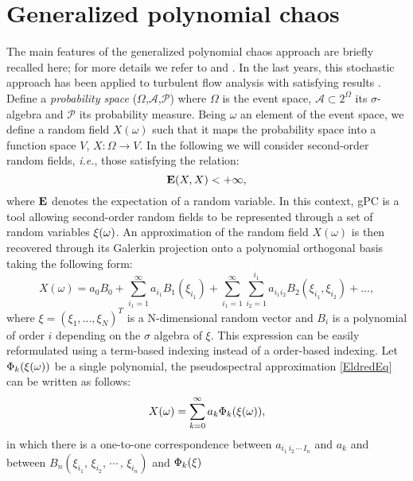 \documentclass[conf]{new-aiaa}
\begin{document}
\section{Generalized polynomial chaos}
The main features of the generalized polynomial chaos approach are briefly recalled here; for more details we refer to \citet{ghanem2003stochastic} and \citet{le2010spectral}.
%
In the last years, this stochastic approach has been applied to turbulent flow analysis with satisfying results \cite{lucor2007sensitivity}. 
%
Define a {\it probability space} ($\Omega$,$\mathcal{A}$,$\mathcal{P}$) where $\Omega$ is the event space, $\mathcal{A} \subset 2^{\Omega}$ its $\sigma$-algebra and $\mathcal{P}$ its probability measure.
%
Being $\omega$ an element of the event space, we define a random field $X(\omega)$ such that it maps the probability space into a function space $V$, $X:\Omega \rightarrow V$.
%
In the following we will consider second-order random fields, \textit{i.e.}, those satisfying the relation:
\begin{equation}
 {\bf E}(X,X) < + \infty,
\end{equation} 
where ${\bf E}$ denotes the expectation of a random variable.
%
In this context, gPC is a tool allowing second-order random fields to be represented through a set of random variables ${\bf \xi}(\omega)$.
%
An approximation of the random field $X(\omega)$ is then recovered through its Galerkin projection onto a polynomial orthogonal basis taking the following form:
%
\begin{equation}
X(\omega)=a_0B_0 + \sum_{i_1=1}^{\infty}a_{i_1}B_1({ \xi_{i_1}})+ \sum_{i_1=1}^{\infty} \sum_{i_2=1}^{i_1}a_{i_1 i_2}B_2({ \xi_{i_1}, \xi_{i_2}}) + ...,
\label{EldredEq}
\end{equation}
%
where $\xi = (\xi_1, ..., \xi_N)^T$ is a N-dimensional random vector and $B_i$ is a polynomial of order $i$ depending on the $\sigma$ algebra of $\xi$.
%
This expression can be easily reformulated using a term-based indexing instead of a order-based indexing.
%
Let $\Phi_k({\bf \xi}(\omega))$ be a single polynomial, the pseudospectral approximation \eqref{EldredEq} can be written as follows:
%
\begin{equation}
X(\omega)=\sum_{k=0}^{\infty}a_k\Phi_k({\bf \xi}(\omega)),
\label{LucorEq}
\end{equation}
%
in which there is a one-to-one correspondence between $a_{i_1 \, i_2 \, \cdots \, I_n}$ and $a_k$ and between $B_n({ \xi_{i_1}, \, \xi_{i_2}, \, \cdots \,, \, \xi_{i_n}})$ and $\Phi_k({\bf \xi})$
\end{document}
